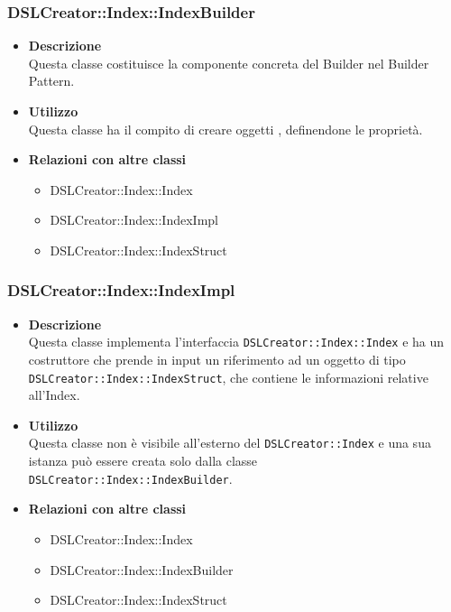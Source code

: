  \subsubsection{DSLCreator::Index::IndexBuilder}
                    \begin{itemize}
                        \item \textbf{Descrizione} \hfill \\
                            Questa classe costituisce la componente concreta del Builder nel Builder Pattern.
                        \item \textbf{Utilizzo} \hfill \\
                            Questa classe ha il compito di creare oggetti , definendone le proprietà.
                        \item \textbf{Relazioni con altre classi}
                            \begin{itemize}
                              \item DSLCreator::Index::Index
                              \item DSLCreator::Index::IndexImpl
                              \item DSLCreator::Index::IndexStruct
                            \end{itemize}
                    \end{itemize}
  
 \subsubsection{DSLCreator::Index::IndexImpl}
                    \begin{itemize}
                        \item \textbf{Descrizione} \hfill \\
                          Questa classe implementa l'interfaccia \texttt{DSLCreator::Index::Index} e ha un costruttore che prende in input un riferimento ad un oggetto di tipo \texttt{DSLCrea\-tor::Index::IndexStruct}, che contiene le informazioni relative all'Index.
                        \item \textbf{Utilizzo} \hfill \\
                          Questa classe non è visibile all'esterno del  \texttt{DSLCreator::Index} e una sua istanza può essere creata solo dalla classe \texttt{DSLCreator::Index::IndexBuilder}.
                        \item \textbf{Relazioni con altre classi}
                            \begin{itemize}
                              \item DSLCreator::Index::Index
                              \item DSLCreator::Index::IndexBuilder
                              \item DSLCreator::Index::IndexStruct
                            \end{itemize}
                    \end{itemize}

